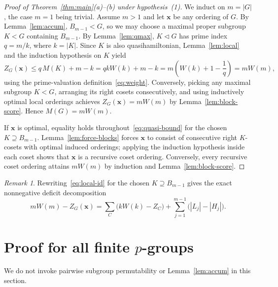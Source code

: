 \documentclass[11pt,reqno]{amsart}
\numberwithin{equation}{section}
\theoremstyle{definition}
\theoremstyle{remark}
\newtheorem{remark}[theorem]{Remark}
\begin{document}
\begin{proof}[Proof of Theorem~\ref{thm:main}(a)--(b) under hypothesis~(1)]
We induct on $m=|G|$, the case $m=1$ being trivial. Assume $m>1$ and let $\mathbf{x}$ be any ordering of $G$. By Lemma~\ref{lem:accum}, $B_{m-1}<G$, so we may choose a maximal proper subgroup $K<G$ containing $B_{m-1}$. By Lemma~\ref{lem:qmax}, $K\lhd G$ has prime index $q=m/k$, where $k=|K|$. Since $K$ is also quasihamiltonian, Lemma~\ref{lem:local} and the induction hypothesis on $K$ yield
\begin{equation}
\label{eq:quasi-bound}
Z_G(\mathbf{x}) \le q\,M(K) + m - k = qkW(k) + m - k = m\!\left(W(k) + 1 - \frac{1}{q}\right) = mW(m),
\end{equation}
using the prime-valuation definition~\eqref{eq:weight}. Conversely, picking any maximal subgroup $K<G$, arranging its right cosets consecutively, and using inductively optimal local orderings achieves $Z_G(\mathbf{x})=mW(m)$ by Lemma~\ref{lem:block-score}. Hence $M(G)=mW(m)$.

If $\mathbf{x}$ is optimal, equality holds throughout~\eqref{eq:quasi-bound} for the chosen $K\supseteq B_{m-1}$. Lemma~\ref{lem:force-blocks} forces $\mathbf{x}$ to consist of consecutive right $K$-cosets with optimal induced orderings; applying the induction hypothesis inside each coset shows that $\mathbf{x}$ is a recursive coset ordering. Conversely, every recursive coset ordering attains $mW(m)$ by induction and Lemma~\ref{lem:block-score}.
\end{proof}

\begin{remark}
Rewriting~\eqref{eq:local-id} for the chosen $K\supseteq B_{m-1}$ gives the exact nonnegative deficit decomposition
\[
mW(m) - Z_G(\mathbf{x}) = \sum_C \bigl(kW(k) - Z_C\bigr) + \sum_{j=1}^{m-1} \bigl(|L_j|-|H_j|\bigr).
\]
\end{remark}

\section{Proof for all finite $p$-groups}
\label{sec:pgroup}

We do not invoke pairwise subgroup permutability or Lemma~\ref{lem:accum} in this section.
\end{document}
